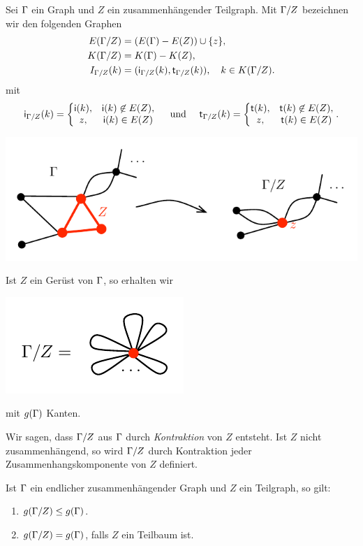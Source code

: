 \documentclass[a4paper, 12pt, twoside]{article}
\begin{document}
\DB Sei $\Gamma$ ein Graph und $Z$ ein zusammenhängender Teilgraph.
Mit $\Gamma/Z$ bezeichnen
wir den folgenden Graphen
\begin{align*}
E(\Gamma/Z) &= ( E(\Gamma)-E(Z) )\cup\{z\},\\
K(\Gamma/Z) &= K(\Gamma)-K(Z),\\
I_{\Gamma/Z}(k) &= (\mathsf{i}_{\Gamma/Z}(k),\mathsf{t}_{\Gamma/Z}(k)), \quad k\in K(\Gamma/Z).
\end{align*}
mit
\[
\mathsf{i}_{\Gamma/Z}(k) =
\left\{\begin{matrix}
\mathsf{i}(k), & \mathsf{i}(k)\not\in E(Z),\\
z, & \mathsf{i}(k)\in E(Z)
\end{matrix}\right.
\quad
\text{ und }
\quad
\mathsf{t}_{\Gamma/Z}(k) =
\left\{\begin{matrix}
\mathsf{t}(k), & \mathsf{t}(k)\not\in E(Z),\\
z, & \mathsf{t}(k)\in E(Z)
\end{matrix}\right.
.
\]
\begin{center}
	\includegraphics{grugraImages/GZ1}
\end{center}

\BSP Ist $Z$ ein Gerüst von $\Gamma$, so erhalten wir
\begin{center}
	\includegraphics{grugraImages/GZ2}
\end{center}
mit $g(\Gamma)$ Kanten.

\DEF
Wir sagen, dass $\Gamma/Z$ aus $\Gamma$ durch \emph{Kontraktion}
von $Z$ entsteht.
Ist $Z$ nicht zusammenhängend, so wird $\Gamma/Z$ durch Kontraktion
jeder Zusammen\-hangskomponente von $Z$ definiert.

\BEM \label{bem_GZ}
Ist $\Gamma$ ein endlicher zusammenhängender Graph und $Z$ ein
Teilgraph, so gilt:
\begin{enumerate}
\item $g(\Gamma/Z) \leq g(\Gamma)$.
\item $g(\Gamma/Z) = g(\Gamma)$, falls $Z$ ein Teilbaum ist.
\end{enumerate}
\end{document}
